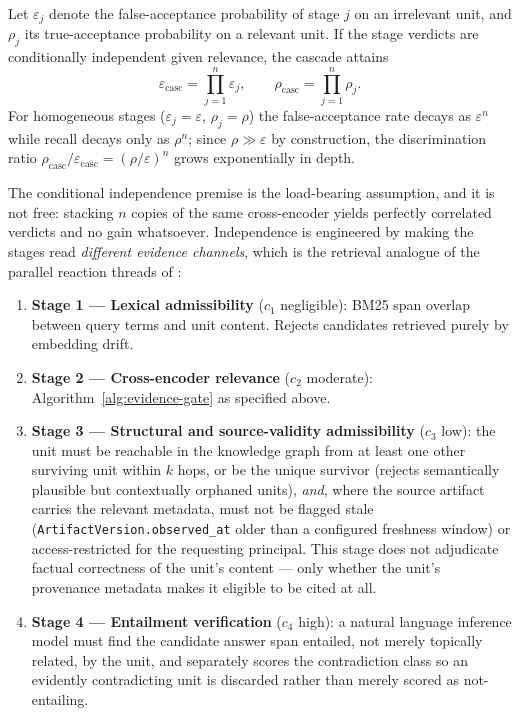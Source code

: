 \begin{theorem}
\label{thm:error-suppression}
Let $\varepsilon_j$ denote the false-acceptance probability of stage $j$ on an irrelevant unit, and $\rho_j$ its true-acceptance probability on a relevant unit. If the stage verdicts are conditionally independent given relevance, the cascade attains
\begin{equation}
\varepsilon_{\text{casc}} = \prod_{j=1}^{n} \varepsilon_j, \qquad
\rho_{\text{casc}} = \prod_{j=1}^{n} \rho_j .
\end{equation}
For homogeneous stages ($\varepsilon_j = \varepsilon$, $\rho_j = \rho$) the false-acceptance rate decays as $\varepsilon^n$ while recall decays only as $\rho^n$; since $\rho \gg \varepsilon$ by construction, the discrimination ratio $\rho_{\text{casc}}/\varepsilon_{\text{casc}} = (\rho/\varepsilon)^n$ grows exponentially in depth.
\end{theorem}

The conditional independence premise is the load-bearing assumption, and it is not free: stacking $n$ copies of the same cross-encoder yields perfectly correlated verdicts and no gain whatsoever. Independence is engineered by making the stages read \emph{different evidence channels}, which is the retrieval analogue of the parallel reaction threads of \citet{kirby2025parallel}:

\begin{enumerate}
  \item \textbf{Stage 1 --- Lexical admissibility} ($c_1$ negligible): BM25 span overlap between query terms and unit content. Rejects candidates retrieved purely by embedding drift.
  \item \textbf{Stage 2 --- Cross-encoder relevance} ($c_2$ moderate): Algorithm~\ref{alg:evidence-gate} as specified above.
  \item \textbf{Stage 3 --- Structural and source-validity admissibility} ($c_3$ low): the unit must be reachable in the knowledge graph from at least one other surviving unit within $k$ hops, or be the unique survivor (rejects semantically plausible but contextually orphaned units), \emph{and}, where the source artifact carries the relevant metadata, must not be flagged stale (\texttt{ArtifactVersion.observed\_at} older than a configured freshness window) or access-restricted for the requesting principal. This stage does not adjudicate factual correctness of the unit's content --- only whether the unit's provenance metadata makes it eligible to be cited at all.
  \item \textbf{Stage 4 --- Entailment verification} ($c_4$ high): a natural language inference model must find the candidate answer span entailed, not merely topically related, by the unit, and separately scores the contradiction class so an evidently contradicting unit is discarded rather than merely scored as not-entailing.
\end{enumerate}

